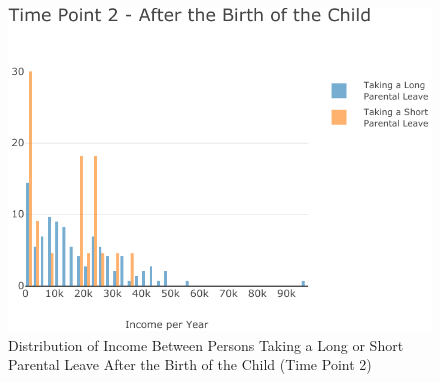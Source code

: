 \documentclass[
  12pt,
]{article}
\begin{document}
\begin{figure}

{\centering \includegraphics{Parental_Leave-Finalizing-Data-Set_files/figure-latex/fig-4-1} 

}

\caption{Distribution of Income Between Persons Taking a Long or Short Parental Leave After the Birth of the Child (Time Point 2)}\label{fig:fig-4}
\end{figure}
\end{document}
